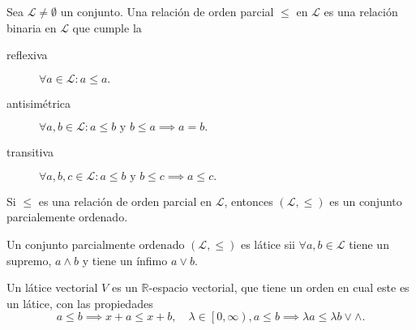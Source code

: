 \begin{frame}
	\frametitle{\secname}

	\begin{definition}[Poset]
		Sea $\mathcal{L}\neq\emptyset$ un conjunto.
		Una \alert{relación de orden parcial} $\leq$ en $\mathcal{L}$ es
		una relación binaria en $\mathcal{L}$ que cumple la
		\begin{description}
			\item[reflexiva]

				\begin{math}
					\forall a\in\mathcal{L}:
					a\leq a.
				\end{math}

			\item[antisimétrica]

				\begin{math}
					\forall a,b\in\mathcal{L}:
					a\leq b
					\text{ y }
					b\leq a\implies
					a=b.
				\end{math}

			\item[transitiva]

				\begin{math}
					\forall a,b,c\in\mathcal{L}:
					a\leq b
					\text{ y }
					b\leq c\implies
					a\leq c.
				\end{math}
		\end{description}
		Si $\leq$ es una relación de orden parcial en $\mathcal{L}$,
		entonces $\left(\mathcal{L},\leq\right)$ es un
		\alert{conjunto parcialemente ordenado}.
	\end{definition}
	\begin{definition}[Látice]
		Un conjunto parcialmente
		ordenado $\left(\mathcal{L},\leq\right)$ es \alert{látice} sii
		$\forall a,b\in\mathcal{L}$ tiene un supremo, $a\wedge b$ y tiene
		un ínfimo $a\vee b$.
	\end{definition}

	\begin{definition}
		Un \alert{látice vectorial} $V$ es un $\mathds{R}$-espacio
		vectorial, que tiene un orden en cual este es un látice, con las
		propiedades
		\begin{equation*}
			a\leq b\implies
			x+a\leq x+b,\quad
			\lambda\in\left[0,\infty\right), a\leq b\implies
			\lambda a\leq\lambda b\vee\wedge.
		\end{equation*}
	\end{definition}

\end{frame}